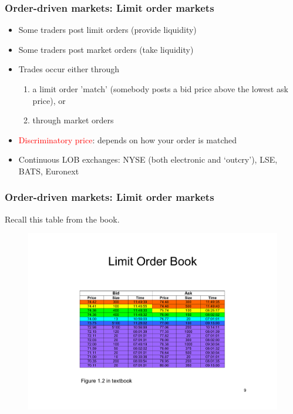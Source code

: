 \documentclass[english,10pt]{beamer}
\theoremstyle{definition}
\begin{document}
\begin{frame}
\frametitle{Order-driven markets: Limit order markets}

\begin{itemize}


\item Some traders post limit orders (provide liquidity)
\item Some traders post market orders (take liquidity)


\item Trades occur either through 
\begin{enumerate}
\item a limit order 'match' (somebody posts a bid price above the lowest ask price), or
\item through market orders
\end{enumerate}

\item \textcolor{red}{Discriminatory price}: depends on how your order is matched


\item Continuous LOB exchanges: NYSE (both electronic and `outcry'), LSE, BATS, Euronext

\end{itemize}


\end{frame}




\begin{frame}[label=main3]
\frametitle{Order-driven markets: Limit order markets}
Recall this table from the book.

\begin{figure}
\includegraphics[width=.7\paperwidth]{pics/Image_LOB}
\end{figure}

\hyperlink{LOB}{}


\end{frame}
\end{document}
